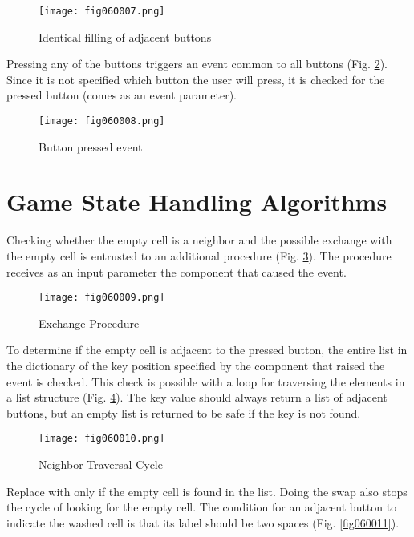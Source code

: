 \begin{figure}[H]
   \centering
   \texttt{[image: fig060007.png]}
   \caption{Identical filling of adjacent buttons}
\label{fig060007}
\end{figure}

Pressing any of the buttons triggers an event common to all buttons (Fig. \ref{fig060008}). Since it is not specified which button the user will press, it is checked for the pressed button (comes as an event parameter).

\begin{figure}[H]
   \centering
   \texttt{[image: fig060008.png]}
   \caption{Button pressed event}
\label{fig060008}
\end{figure}

\section{Game State Handling Algorithms}

Checking whether the empty cell is a neighbor and the possible exchange with the empty cell is entrusted to an additional procedure (Fig. \ref{fig060009}). The procedure receives as an input parameter the component that caused the event.

\begin{figure}[H]
   \centering
   \texttt{[image: fig060009.png]}
   \caption{Exchange Procedure}
\label{fig060009}
\end{figure}

To determine if the empty cell is adjacent to the pressed button, the entire list in the dictionary of the key position specified by the component that raised the event is checked. This check is possible with a loop for traversing the elements in a list structure (Fig. \ref{fig060010}). The key value should always return a list of adjacent buttons, but an empty list is returned to be safe if the key is not found.

\begin{figure}[H]
   \centering
   \texttt{[image: fig060010.png]}
   \caption{Neighbor Traversal Cycle}
\label{fig060010}
\end{figure}

Replace with only if the empty cell is found in the list. Doing the swap also stops the cycle of looking for the empty cell. The condition for an adjacent button to indicate the washed cell is that its label should be two spaces (Fig. \ref{fig060011}).

